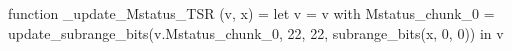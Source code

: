 function _update_Mstatus_TSR (v, x) = let v = { v with Mstatus_chunk_0 = update_subrange_bits(v.Mstatus_chunk_0, 22, 22, subrange_bits(x, 0, 0)) } in
  v
